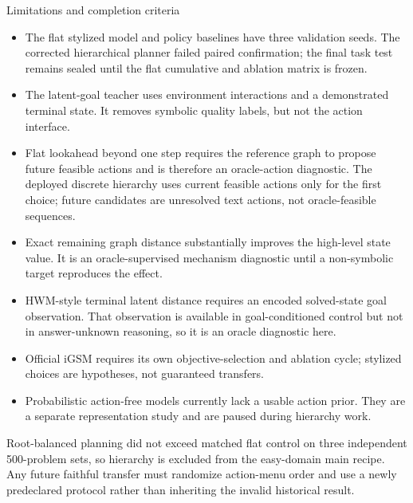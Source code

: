 \documentclass[aspectratio=169,10pt]{beamer}
\begin{document}
\begin{frame}{Limitations and completion criteria}
\footnotesize
\begin{itemize}\itemsep1pt
\item The flat stylized model and policy baselines have three validation seeds.
The corrected hierarchical planner failed paired confirmation; the final task
test remains sealed until the flat cumulative and ablation matrix is frozen.
\item The latent-goal teacher uses environment interactions and a demonstrated
terminal state. It removes symbolic quality labels, but not the action
interface.
\item Flat lookahead beyond one step requires the reference graph to propose
future feasible actions and is therefore an oracle-action diagnostic. The
deployed discrete hierarchy uses current feasible actions only for the first
choice; future candidates are unresolved text actions, not oracle-feasible
sequences.
\item Exact remaining graph distance substantially improves the high-level
state value. It is an oracle-supervised mechanism diagnostic until a
non-symbolic target reproduces the effect.
\item HWM-style terminal latent distance requires an encoded solved-state goal
observation. That observation is available in goal-conditioned control but not
in answer-unknown reasoning, so it is an oracle diagnostic here.
\item Official iGSM requires its own objective-selection and ablation cycle; stylized
choices are hypotheses, not guaranteed transfers.
\item Probabilistic action-free models currently lack a usable action prior.
They are a separate representation study and are paused during hierarchy work.
\end{itemize}

\medskip
Root-balanced planning did not exceed matched flat control on three independent
500-problem sets, so hierarchy is excluded from the easy-domain main recipe.
Any future faithful transfer must randomize action-menu order and use a newly
predeclared protocol rather than inheriting the invalid historical result.
\end{frame}
\end{document}
